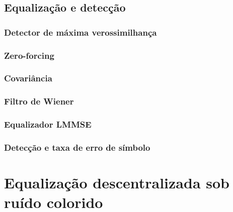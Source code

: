 \section{Equalização e detecção}\label{sec:equalization}

\subsection{Detector de máxima verossimilhança}
\subsection{Zero-forcing}
\subsection{Covariância}
\subsection{Filtro de Wiener}
\subsection{Equalizador LMMSE}
\subsection{Detecção e taxa de erro de símbolo}

\chapter{Equalização descentralizada sob ruído colorido}\label{chap:dbp-ruido}


